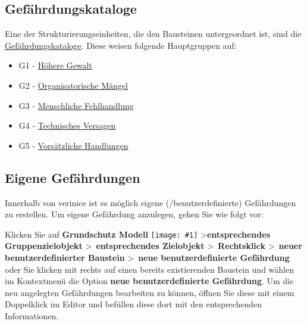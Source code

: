 \documentclass[a4paper,10pt]{book}
\newcommand{\icon}[1]{\texttt{[image: \#1]}}
\begin{document}
\subsection{Gefährdungskataloge}

Eine der Strukturierungseinheiten, die den Bausteinen untergeordnet ist, sind die \href{https://www.bsi.bund.de/cln_156/DE/Themen/weitereThemen/ITGrundschutzKataloge/Inhalt/Gefaehrdungskataloge/gefaehrdungskataloge_node.html}{Gefährdungskataloge}. Diese weisen folgende Hauptgruppen auf:
\begin{itemize}
\item G1 - \href{https://www.bsi.bund.de/cln_156/DE/Themen/weitereThemen/ITGrundschutzKataloge/Inhalt/Gefaehrdungskataloge/G1HoehereGewalt/g1hoeheregewalt_node.html}{Höhere Gewalt}
\item G2 - \href{https://www.bsi.bund.de/cln_156/DE/Themen/weitereThemen/ITGrundschutzKataloge/Inhalt/Gefaehrdungskataloge/G2OrganisatorischeMaengel/g2organisatorischemaengel_node.html}{Organisatorische Mängel}
\item G3 - \href{https://www.bsi.bund.de/cln_156/DE/Themen/weitereThemen/ITGrundschutzKataloge/Inhalt/Gefaehrdungskataloge/G3MenschlicheFehlhandlung/g3menschlichefehlhandlung_node.html}{Menschliche Fehlhandlung}
\item G4 - \href{https://www.bsi.bund.de/cln_156/DE/Themen/weitereThemen/ITGrundschutzKataloge/Inhalt/Gefaehrdungskataloge/G4TechnischesVersagen/g4technischesversagen_node.html}{Technisches Versagen}
\item G5 - \href{https://www.bsi.bund.de/cln_156/DE/Themen/weitereThemen/ITGrundschutzKataloge/Inhalt/Gefaehrdungskataloge/G5VorsaetzlicheHandlungen/g5vorsaetzlichehandlungen_node.html}{Vorsätzliche Handlungen}
\end{itemize}

\subsection{Eigene Gefährdungen}
\label{sec_eigene_gefaehrdung}
Innerhalb von verinice ist es möglich eigene (/benutzerdefinierte) Gefährdungen zu erstellen. Um eigene Gefährdung anzulegen, gehen Sie wie folgt vor:

Klicken Sie auf \textbf{Grundschutz Modell} \icon{Icon/GS_Modell.png} \textgreater \textbf{entsprechendes Gruppenzielobjekt}
\textgreater\ \textbf{entsprechendes Zielobjekt} \textgreater\ \textbf{Rechtsklick} \textgreater\ \textbf{neuer benutzerdefinierter Baustein} \textgreater\
\textbf{neue benutzerdefinierte Gefährdung} oder Sie klicken mit rechts auf einen bereits existierenden Baustein und wählen im Kontextmenü
die Option \textbf{neue benutzerdefinierte Gefährdung}.
Um die neu angelegten Gefährdungen bearbeiten zu können, öffnen Sie diese mit einem Doppelklick im Editor und befüllen diese dort mit den entsprechenden
Informationen.
\end{document}
